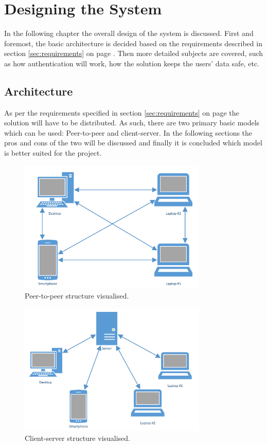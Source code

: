 \chapter{Designing the System}
	\label{chap:design}
	In the following chapter the overall design of the system is discussed. First and foremost, the basic architecture is decided based on the requirements described in section \ref{sec:requirements} on page \pageref{sec:requirements}. Then more detailed subjects are covered, such as how authentication will work, how the solution keeps the users' data safe, etc.

	\section{Architecture}
		\label{sec:arch}
		As per the requirements specified in section \ref{sec:requirements} on page \pageref{sec:requirements} the solution will have to be distributed. As such, there are two primary basic models which can be used: Peer-to-peer and client-server. In the following sections the pros and cons of the two will be discussed and finally it is concluded which model is better suited for the project.

		\begin{figure}[p]
			\centering
			\includegraphics[width=0.8\textwidth]{figures/design/PeerToPeer.pdf}
			\caption{Peer-to-peer structure visualised.}
			\label{fig:peertopeer}
		\end{figure}

		\begin{figure}[p]
			\centering
			\includegraphics[width=0.8\textwidth]{figures/design/ClientServer.pdf}
			\caption{Client-server structure visualised.}
			\label{fig:clientserver}
		\end{figure}


